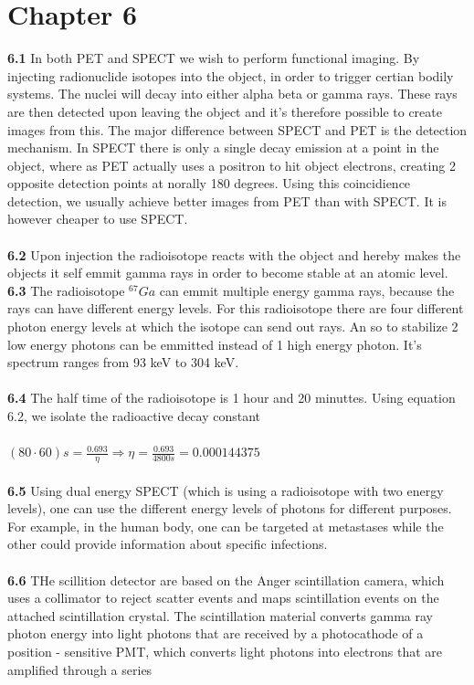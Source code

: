 \documentclass[]{article}
\begin{document}
\section{Chapter 6}
\textbf{6.1} In both PET and SPECT we wish to perform functional imaging. By injecting radionuclide isotopes into the object, in order to trigger certian bodily systems. The nuclei will decay into either alpha beta or gamma rays. These rays are then detected upon leaving the object and it's therefore possible to create images from this. The major difference between SPECT and PET is the detection mechanism. In SPECT there is only a single decay emission at a point in the object, where as PET actually uses a positron to hit object electrons, creating 2 opposite detection points at norally 180 degrees. Using this coincidience detection, we usually achieve better images from PET than with SPECT. It is however cheaper to use SPECT.\\\\
\textbf{6.2} Upon injection the radioisotope reacts with the object and hereby makes the objects it self emmit gamma rays in order to become stable at an atomic level.
\textbf{6.3} The radioisotope $^{67}Ga$ can emmit multiple energy gamma rays, because the rays can have different energy levels. For this radioisotope there are four different photon energy levels at which the isotope can send out rays. An so to stabilize 2 low energy photons can be emmitted instead of 1 high energy photon. It's spectrum ranges from 93 keV to 304 keV.\\\\
\textbf{6.4} The half time of the radioisotope is 1 hour and 20 minuttes. Using equation 6.2, we isolate the radioactive decay constant\\\\
$(80 \cdot 60)s = \frac{0.693}{\eta} \Rightarrow \eta = \frac{0.693}{4800s} = 0.000144375 $\\\\
\textbf{6.5} Using dual energy SPECT (which is using a radioisotope with two energy levels), one can use the different energy levels of photons for different purposes. For example, in the human body, one can be targeted at metastases while the other could provide information about specific infections.\\\\
\textbf{6.6} THe scillition detector are based on the Anger scintillation camera, which uses a collimator to reject scatter events and maps scintillation events on the attached scintillation crystal. The scintillation material converts gamma ray photon energy into light photons that are received by a photocathode of a position - sensitive PMT, which converts light photons into electrons that are amplified through a series
\end{document}
